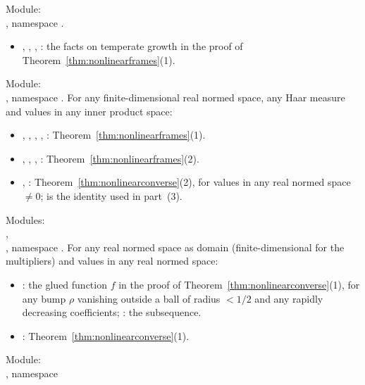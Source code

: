 \documentclass[11pt]{article}
\theoremstyle{definition}
\begin{document}
Module:\\ , namespace .
\begin{itemize}
  \item {}, ,
    , : the facts on temperate
    growth in the proof of Theorem~\ref{thm:nonlinearframes}(1).
\end{itemize}
Module:\\ , namespace
. For any finite-dimensional real normed space, any Haar measure and values in
any inner product space:
\begin{itemize}
  \item {}, , ,
    , :
    Theorem~\ref{thm:nonlinearframes}(1).
  \item {}, , ,
    : Theorem~\ref{thm:nonlinearframes}(2).
  \item {}, :
    Theorem~\ref{thm:nonlinearconverse}(2), for values in any real normed space $\ne 0$;
     is the identity used in part~(3).
\end{itemize}
Modules:\\ ,\\
, namespace
. For any real normed space as domain (finite-dimensional for the multipliers)
and values in any real normed space:
\begin{itemize}
  \item {}: the glued function $f$ in the proof of
    Theorem~\ref{thm:nonlinearconverse}(1), for any bump $\rho$ vanishing outside a ball of
    radius $< 1/2$ and any rapidly decreasing coefficients;
    : the subsequence.
  \item {}: Theorem~\ref{thm:nonlinearconverse}(1).
\end{itemize}
Module:\\ , namespace
\end{document}
